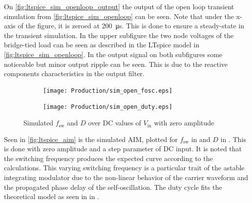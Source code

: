 On \autoref{fig:ltspice_sim_openloop_output} the output of the open loop transient simulation from \autoref{fig:ltspice_sim_openloop} can be seen. Note that under the x-axis of the figure, it is zeroed at \SI{200}{\micro\second}. This is done to ensure a steady-state in the transient simulation. In the upper subfigure the two node voltages of the bridge-tied load can be seen as described in the LTspice model in \autoref{fig:ltspice_sim_openloop}. In the output signal on both subfigures some noticeable but minor output ripple can be seen. This is due to the reactive components characteristics in the output filter.

\begin{figure}[htbp]
	\begin{subfigure}[t]{0.5\textwidth}
		\centering
		\texttt{[image: Production/sim\_open\_fosc.eps]}
		\label{fig:ltspice_aim_fosc}
	\end{subfigure}%
	\begin{subfigure}[t]{0.5\textwidth}
		\centering
		\texttt{[image: Production/sim\_open\_duty.eps]}
		\label{fig:ltspice_aim_duty}
	\end{subfigure}
	\caption{Simulated $f_{\mathrm{sw}}$ and $D$ over DC values of $V_{\mathrm{in}}$ with zero amplitude}
	\label{fig:ltspice_aim}
\end{figure}
Seen in \autoref{fig:ltspice_aim} is the simulated AIM, plotted for $f_{\mathrm{sw}}$ in  and $D$ in . This is done with zero amplitude and a step parameter of DC input. It is noted that the switching frequency produces the expected curve according to the calculations. This varying switching frequency is a particular trait of the astable integrating modulator due to the non-linear behavior of the carrier waveform and the propagated phase delay of the self-oscillation. The duty cycle fits the theoretical model as seen in in .


